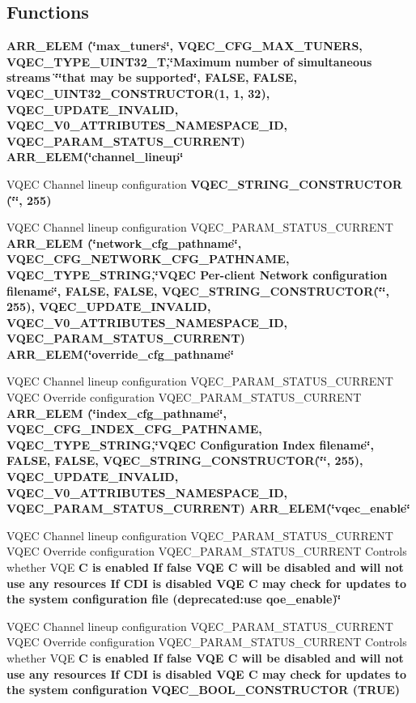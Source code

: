 \subsection*{Functions}
\begin{CompactItemize}
\item 
\bf{ARR\_\-ELEM} (\char`\"{}max\_\-tuners\char`\"{}, VQEC\_\-CFG\_\-MAX\_\-TUNERS, \bf{VQEC\_\-TYPE\_\-UINT32\_\-T},\char`\"{}Maximum number of simultaneous streams \char`\"{}\char`\"{}that may be supported\char`\"{}, FALSE, \bf{FALSE}, VQEC\_\-UINT32\_\-CONSTRUCTOR(1, 1, 32), \bf{VQEC\_\-UPDATE\_\-INVALID}, \bf{VQEC\_\-V0\_\-ATTRIBUTES\_\-NAMESPACE\_\-ID}, VQEC\_\-PARAM\_\-STATUS\_\-CURRENT) ARR\_\-ELEM(\char`\"{}channel\_\-lineup\char`\"{}
\item 
VQEC Channel lineup configuration \bf{VQEC\_\-STRING\_\-CONSTRUCTOR} (\char`\"{}\char`\"{}, 255)
\item 
VQEC Channel lineup configuration VQEC\_\-PARAM\_\-STATUS\_\-CURRENT \bf{ARR\_\-ELEM} (\char`\"{}network\_\-cfg\_\-pathname\char`\"{}, VQEC\_\-CFG\_\-NETWORK\_\-CFG\_\-PATHNAME, \bf{VQEC\_\-TYPE\_\-STRING},\char`\"{}VQEC Per-client Network configuration \bf{filename}\char`\"{}, FALSE, \bf{FALSE}, VQEC\_\-STRING\_\-CONSTRUCTOR(\char`\"{}\char`\"{}, 255), \bf{VQEC\_\-UPDATE\_\-INVALID}, \bf{VQEC\_\-V0\_\-ATTRIBUTES\_\-NAMESPACE\_\-ID}, VQEC\_\-PARAM\_\-STATUS\_\-CURRENT) ARR\_\-ELEM(\char`\"{}override\_\-cfg\_\-pathname\char`\"{}
\item 
VQEC Channel lineup configuration VQEC\_\-PARAM\_\-STATUS\_\-CURRENT VQEC Override configuration VQEC\_\-PARAM\_\-STATUS\_\-CURRENT \bf{ARR\_\-ELEM} (\char`\"{}index\_\-cfg\_\-pathname\char`\"{}, VQEC\_\-CFG\_\-INDEX\_\-CFG\_\-PATHNAME, \bf{VQEC\_\-TYPE\_\-STRING},\char`\"{}VQEC Configuration Index \bf{filename}\char`\"{}, FALSE, \bf{FALSE}, VQEC\_\-STRING\_\-CONSTRUCTOR(\char`\"{}\char`\"{}, 255), \bf{VQEC\_\-UPDATE\_\-INVALID}, \bf{VQEC\_\-V0\_\-ATTRIBUTES\_\-NAMESPACE\_\-ID}, VQEC\_\-PARAM\_\-STATUS\_\-CURRENT) ARR\_\-ELEM(\char`\"{}vqec\_\-enable\char`\"{}
\item 
VQEC Channel lineup configuration VQEC\_\-PARAM\_\-STATUS\_\-CURRENT VQEC Override configuration VQEC\_\-PARAM\_\-STATUS\_\-CURRENT Controls whether VQE \bf{C} is enabled If false VQE \bf{C} will be disabled and will not use any resources If CDI is disabled VQE \bf{C} may check for updates \bf{to} the system configuration \bf{file} (deprecated:use qoe\_\-enable)\char`\"{}
\item 
VQEC Channel lineup configuration VQEC\_\-PARAM\_\-STATUS\_\-CURRENT VQEC Override configuration VQEC\_\-PARAM\_\-STATUS\_\-CURRENT Controls whether VQE \bf{C} is enabled If false VQE \bf{C} will be disabled and will not use any resources If CDI is disabled VQE \bf{C} may check for updates \bf{to} the system configuration \bf{VQEC\_\-BOOL\_\-CONSTRUCTOR} (\bf{TRUE})

\end{CompactItemize}
